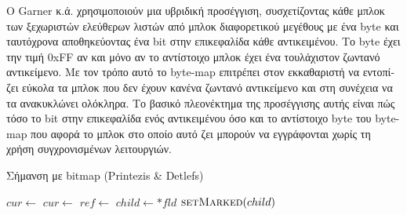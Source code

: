 \begin{greek}
Ο Garner κ.ά. \cite{DBLP:conf/iwmm/GarnerBF07} χρησιμοποιούν μια
υβριδική προσέγγιση, συσχετίζοντας κάθε μπλοκ των ξεχωριστών 
ελεύθερων λιστών από μπλοκ διαφορετικού μεγέθους με ένα byte
και ταυτόχρονα αποθηκεύοντας ένα bit στην επικεφαλίδα κάθε
αντικειμένου. Το byte έχει την τιμή 0xFF αν και μόνο αν το
αντίστοιχο μπλοκ έχει ένα τουλάχιστον ζωντανό αντικείμενο.
Με τον τρόπο αυτό το byte-map επιτρέπει στον εκκαθαριστή να
εντοπίζει εύκολα τα μπλοκ που δεν έχουν κανένα ζωντανό αντικείμενο
και στη συνέχεια να τα ανακυκλώνει ολόκληρα. Το βασικό πλεονέκτημα
της προσέγγισης αυτής είναι πώς τόσο το bit στην επικεφαλίδα ενός 
αντικειμένου όσο και το αντίστοιχο byte του byte-map που αφορά
το μπλοκ στο οποίο αυτό ζει μπορούν να εγγράφονται χωρίς τη
χρήση συγχρονισμένων λειτουργιών.

\begin{algorithm}
  \caption{Σήμανση με bitmap (Printezis \& Detlefs)}
  \label{alg:mrkswp_4}
  \begin{algorithmic}[1]
      \State $cur \gets$ 
        \State {}
        \State {}
        \State $cur \gets$ 
      \EndWhile
    \EndProcedure
    \Statex
        \State $ref \gets$ 
          \State $child \gets *fld$
            \State $\Call{setMarked}{child}$
              \State {}
            \EndIf
          \EndIf
        \EndFor
      \EndWhile
    \EndProcedure
  \end{algorithmic}
\end{algorithm}


\end{greek}
